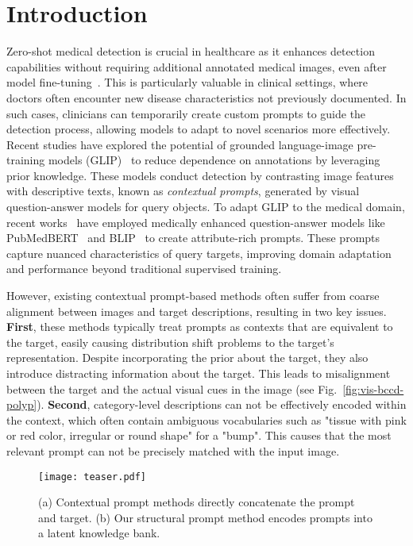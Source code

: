 \section{Introduction}
\label{sec:intro}

Zero-shot medical detection is crucial in healthcare as it enhances detection capabilities without requiring additional annotated medical images, even after model fine-tuning~\citep{badawi2024review, mahapatra2021medical, qin2023medical}. This is particularly valuable in clinical settings, where doctors often encounter new disease characteristics not previously documented. In such cases, clinicians can temporarily create custom prompts to guide the detection process, allowing models to adapt to novel scenarios more effectively. Recent studies have explored the potential of grounded language-image pre-training models (GLIP)~\citep{phan2024decomposing, tiu2022expert, li2022grounded, yao2022detclip} to reduce dependence on annotations by leveraging prior knowledge.
These models conduct detection by contrasting image features with descriptive texts, known as \textit{contextual prompts}, generated by visual question-answer models for query objects. To adapt GLIP to the medical domain, recent works~\citep{qin2023medical, wu2023zero, guo2023multiple} have employed medically enhanced question-answer models like PubMedBERT~\citep{gu2021domain} and BLIP~\citep{li2022blip} to create attribute-rich prompts. These prompts capture nuanced characteristics of query targets, improving domain adaptation and performance beyond traditional supervised training.

However, existing contextual prompt-based methods often suffer from coarse alignment between images and target descriptions, resulting in two key issues. \textbf{First}, these methods typically treat prompts as contexts that are equivalent to the target, easily causing distribution shift problems to the target's representation. Despite incorporating the prior about the target, they also introduce distracting information about the target. This leads to misalignment between the target and the actual visual cues in the image (see Fig.~\ref{fig:vis-bccd-polyp}). 
\textbf{Second}, category-level descriptions can not  be effectively encoded within the context, which often contain ambiguous vocabularies such as "tissue with pink or red color, irregular or round shape" for a "bump". This causes that the most relevant prompt can not be precisely matched with the input image.

\begin{figure}[t]
  \centering
\texttt{[image: teaser.pdf]}
  \caption{(a) {Contextual prompt methods directly concatenate the prompt and target. 
  (b) Our structural prompt method encodes prompts into a latent knowledge bank.}}
  \label{fig:teaser}
  \vspace{-20pt}
\end{figure}

